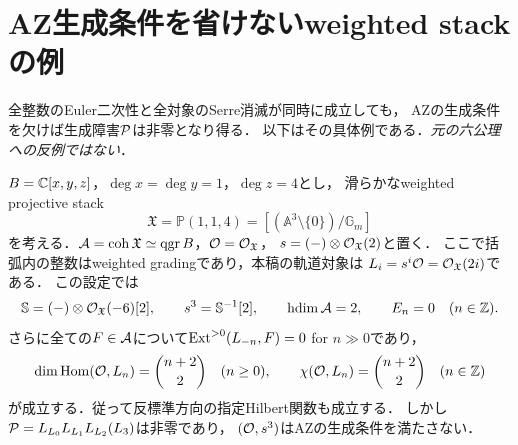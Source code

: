 \documentclass[11pt,a4paper]{ltjsarticle}
\begin{document}
\section{AZ生成条件を省けないweighted stackの例}\label{sec:weightedstackobstruction}
全整数のEuler二次性と全対象のSerre消滅が同時に成立しても，
AZの生成条件を欠けば生成障害$\mathcal P$は非零となり得る．
以下はその具体例である．\emph{元の六公理への反例ではない}．

\begin{example}\label{ex:weightedstackdefect}
$B=\mathbb C[x,y,z]$，$\deg x=\deg y=1$，$\deg z=4$とし，
滑らかなweighted projective stack
\[
 \mathfrak X=\mathbb P(1,1,4)
 =[(\mathbb A^3\setminus\{0\})/\mathbb G_m]
\]
を考える．$\mathcal A=\operatorname{coh}\mathfrak X\simeq\operatorname{qgr} B$，$\mathcal O=\mathcal O_{\mathfrak X}$，
$s=(-)\otimes\mathcal O_{\mathfrak X}(2)$と置く．
ここで括弧内の整数はweighted gradingであり，本稿の軌道対象は
$L_i=s^i\mathcal O=\mathcal O_{\mathfrak X}(2i)$である．
この設定では
\begin{equation}\label{eq:weightedstackproperties}
 \mathbb S=(-)\otimes\mathcal O_{\mathfrak X}(-6)[2],\qquad
 s^3=\mathbb S^{-1}[2],\qquad \operatorname{hdim}\mathcal A=2,
 \qquad E_n=0\quad(n\in\mathbb Z).
\end{equation}
さらに全ての$F\in\mathcal A$について$\operatorname{Ext}^{>0}(L_{-n},F)=0$ for $n\gg0$であり，
\begin{equation}\label{eq:weightedstackhilbert}
 \dim\operatorname{Hom}(\mathcal O,L_n)=\binom{n+2}{2}\quad(n\geq0),
 \qquad \chi(\mathcal O,L_n)=\binom{n+2}{2}\quad(n\in\mathbb Z)
\end{equation}
が成立する．従って反標準方向の指定Hilbert関数も成立する．
しかし$\mathcal P=L_{L_0}L_{L_1}L_{L_2}(L_3)$は非零であり，
$(\mathcal O,s^3)$はAZの生成条件を満たさない．
\end{example}
\end{document}
